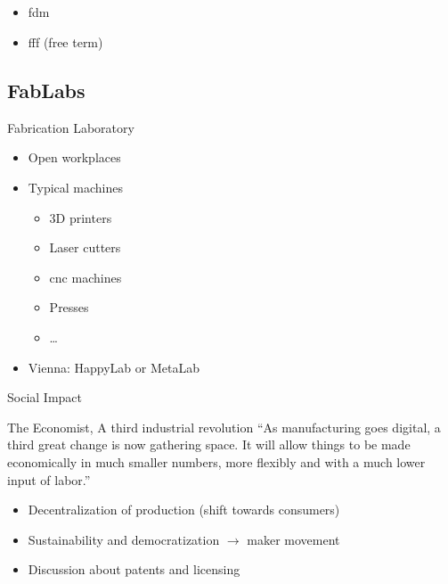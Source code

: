 \documentclass[aspectratio=169]{beamer}
\begin{document}
\subsection{}
\begin{frame}
    \begin{itemize}
        \item \gls{fdm} \texttrademark
        \item \gls{fff} (free term)
    \end{itemize}
\end{frame}

\subsection{FabLabs}
\begin{frame}
    \par Fabrication Laboratory
    \begin{itemize}
        \item Open workplaces
        \item Typical machines
              \begin{itemize}
                  \item 3D printers
                  \item Laser cutters
                  \item \acs{cnc} machines
                  \item Presses
                  \item \ldots
              \end{itemize}
        \item Vienna: HappyLab or MetaLab
    \end{itemize}
\end{frame}

\begin{frame}{Social Impact}
    \begin{block}{The Economist, A third industrial revolution}
        ``As manufacturing goes digital, a third great change is now gathering space.
        It will allow things to be made economically in much smaller numbers, more flexibly and with a much lower input of labor.''
    \end{block}
    \begin{itemize}
        \item Decentralization of production (shift towards consumers)
        \item Sustainability and democratization $\rightarrow$ maker movement
        \item Discussion about patents and licensing
    \end{itemize}
\end{frame}
\end{document}
